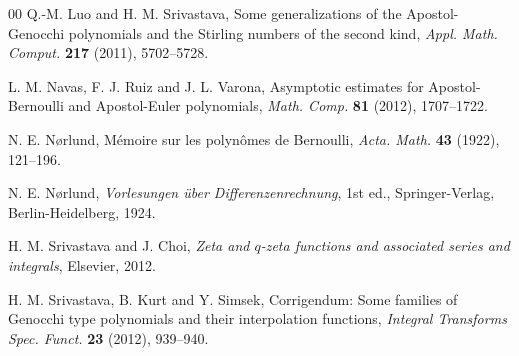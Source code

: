 \documentclass[11pt,a4paper]{amsart}
\theoremstyle{plain}
\theoremstyle{plain}
\theoremstyle{plain}
\begin{document}
\begin{thebibliography}{00}
Q.-M. Luo and H. M. Srivastava,
{Some generalizations of the Apostol-Genocchi polynomials and the Stirling numbers of the second kind},
\textit{Appl. Math. Comput.} 
\textbf{217} (2011), 5702--5728.

L. M. Navas, F. J. Ruiz and J. L. Varona,
Asymptotic estimates for Apostol-Bernoulli and Apostol-Euler polynomials,
\textit{Math. Comp.}
\textbf{81} (2012), 1707--1722.

N. E. N{\o}rlund, %
M\'emoire sur les polyn\^omes de Bernoulli,
\textit{Acta. Math.} 
\textbf{43} (1922), 121--196.

N. E. N{\o}rlund, %
\textit{Vorlesungen \"uber Differenzenrechnung}, 1st ed., 
Springer-Verlag, Berlin-Heidelberg, 1924.


H. M. Srivastava and J. Choi, 
\textit{Zeta and $q$-zeta functions and associated series and integrals},
Elsevier, 2012.

H. M. Srivastava, B. Kurt and Y. Simsek, 
{Corrigendum: Some families of Genocchi type polynomials and their interpolation functions},
\textit{Integral Transforms Spec. Funct.} 
\textbf{23} (2012), 939--940.

\end{thebibliography}
\end{document}
